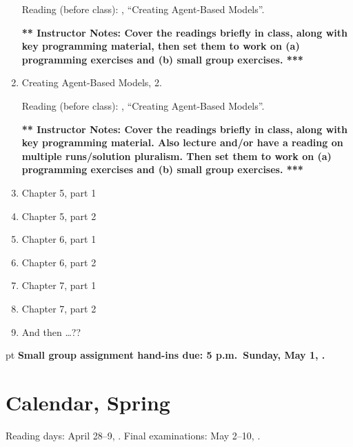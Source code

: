 \documentclass[11pt]{article}
\begin{document}
\begin{enumerate}
Reading (before class): \citep[chapter 4, pages 157--189]{wilensky_rand_2015},
``Creating Agent-Based Models''.

\ifnum{}
{\bf *** Instructor Notes: Cover the readings
  briefly in class, along with key programming material, then set them
  to work on (a) programming exercises and (b) small group exercises. ***}
\fi

\item Creating Agent-Based Models, 2.

Reading (before class): \citep[chapter 4, pages 189--197]{wilensky_rand_2015},
``Creating Agent-Based Models''.

\ifnum{}
{\bf *** Instructor Notes: Cover the readings
  briefly in class, along with key programming material. Also lecture
  and/or have a reading on multiple runs/solution pluralism.  Then set them
  to work on (a) programming exercises and (b) small group exercises. ***}
\fi

\item Chapter 5, part 1

\item Chapter 5, part 2

\item Chapter 6, part 1

\item Chapter 6, part 2

\item Chapter 7, part 1

\item Chapter 7, part 2

\item And then \ldots ??
\end{enumerate}
 pt
{\bf Small group assignment hand-ins due: 5 p.m.\ Sunday, May 1, \year.} 





%
\newpage

\section{Calendar, Spring \year}

Reading days: April 28--9, \year . Final examinations: May 2--10, \year .
\end{document}
